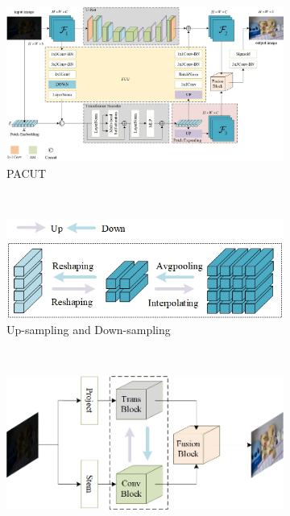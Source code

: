 \documentclass[a4paper]{ctexart}
\begin{document}
\begin{figure}[htb] 
	\centering 
	
	\begin{subfigure}{\textwidth}
		\includegraphics[width=\linewidth]{picture/LLIE/My Architecture/The proposed initial architecture.jpg}
		\captionsetup{font=scriptsize}
		\caption{PACUT}
		\label{fig: First Architecture}
	\end{subfigure}\\
	\begin{subfigure}{0.4\textwidth}
		\includegraphics[width=\linewidth]{picture/LLIE/My Architecture/Up-sampling and down-sampling}
		\captionsetup{font=scriptsize}
		\caption{Up-sampling and Down-sampling}
		\label{fig: Up-sampling and down-sampling}
	\end{subfigure} \
	\begin{subfigure}{0.4\textwidth}
		\includegraphics[width=\linewidth]{picture/LLIE/My Architecture/The proposed initial architecture(Abstract Picture)}

\end{subfigure}
\end{figure}
\end{document}
